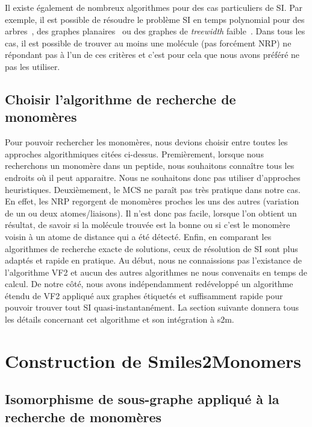 Il existe également de nombreux algorithmes pour des cas particuliers de SI.
Par exemple, il est possible de résoudre le problème SI en temps polynomial pour des arbres~\cite{shamir_faster_1997}, des graphes planaires~\cite{eppstein_subgraph_1995,dorn_planar_2009} ou des graphes de \textit{treewidth} faible~\cite{hajiaghayi_subgraph_2007}.
Dans tous les cas, il est possible de trouver au moins une molécule (pas forcément NRP) ne répondant pas à l'un de ces critères et c'est pour cela que nous avons préféré ne pas les utiliser.


\subsection{Choisir l'algorithme de recherche de monomères}

Pour pouvoir rechercher les monomères, nous devions choisir entre toutes les approches algorithmiques citées ci-dessus.
Premièrement, lorsque nous recherchons un monomère dans un peptide, nous souhaitons connaître tous les endroits où il peut apparaitre.
Nous ne souhaitons donc pas utiliser d'approches heuristiques.
Deuxièmement, le MCS ne paraît pas très pratique dans notre cas.
En effet, les NRP regorgent de monomères proches les uns des autres (variation de un ou deux atomes/liaisons).
Il n'est donc pas facile, lorsque l'on obtient un résultat, de savoir si la molécule trouvée est la bonne ou si c'est le monomère voisin à un atome de distance qui a été détecté.
Enfin, en comparant les algorithmes de recherche exacte de solutions, ceux de résolution de SI sont plus adaptés et rapide en pratique.
Au début, nous ne connaissions pas l'existance de l'algorithme VF2 et aucun des autres algorithmes ne nous convenaits en temps de calcul.
De notre côté, nous avons indépendamment redéveloppé un algorithme étendu de VF2 appliqué aux graphes étiquetés et suffisamment rapide pour pouvoir trouver tout SI quasi-instantanément.
La section suivante donnera tous les détails concernant cet algorithme et son intégration à s2m.




\section{Construction de Smiles2Monomers}

\label{algos_s2m}

\subsection{Isomorphisme de sous-graphe appliqué à la recherche de monomères}

